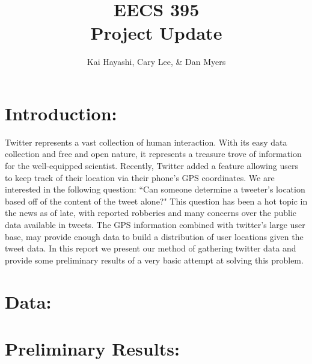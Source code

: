 \documentclass[12pt]{article}
\title{EECS 395 \\ Project Update}
\author{Kai Hayashi, Cary Lee, \& Dan Myers}
\date{}                                           %
\begin{document}
\maketitle
\section*{Introduction:}
Twitter represents a vast collection of human interaction. With its easy data collection and free and open nature, it represents a treasure trove of information for the well-equipped scientist. Recently, Twitter added a feature allowing users to keep track of their location via their phone's GPS coordinates. We are interested in the following question: ``Can someone determine a tweeter's location based off of the content of the tweet alone?" This question has been a hot topic in the news as of late, with reported robberies and many concerns over the public data available in tweets. The GPS information combined with twitter's large user base, may provide enough data to build a distribution of user locations given the tweet data. In this report we present our method of gathering twitter data and provide some preliminary results of a very basic attempt at solving this problem. 

\section*{Data:}


\section*{Preliminary Results:}
\end{document}
